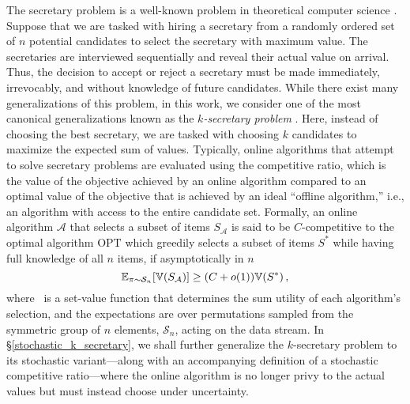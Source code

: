 The secretary problem is a well-known problem in theoretical computer science \cite{dynkin1963optimum,ferguson1989solved}. Suppose that we are tasked with hiring a secretary from a randomly ordered set of $n$ potential candidates to select the secretary with maximum value. The secretaries are interviewed sequentially and reveal their actual value on arrival. Thus, the decision to accept or reject a secretary must be made immediately, irrevocably, and without knowledge of future candidates. While there exist many generalizations of this problem, in this work, we consider one of the most canonical generalizations known as the \textit{$k$-secretary problem} \cite{kleinberg2005multiple}. Here, instead of choosing the best secretary, we are tasked with choosing $k$ candidates to maximize the expected sum of values. Typically, online algorithms that attempt to solve secretary problems are evaluated using the competitive ratio, which is the value of the objective achieved by an online algorithm compared to an optimal value of the objective that is achieved by an ideal ``offline algorithm,” i.e., an algorithm with access to the entire candidate set. Formally, an online algorithm $\mathcal{A}$ that selects a subset of items $S_{\mathcal{A}}$  is said to be $C$-competitive to the optimal algorithm $\textrm{OPT}$ which greedily selects a subset of items $S^*$ while having full knowledge of all $n$ items, if asymptotically in $n$
\begin{equation}
    \mathbb{E}_{\pi\sim \mathcal{S}_n}[\mathbb{V}(S_{\mathcal{A}})] \geq  (C + o(1)) \mathbb{V}(S^*) \,,
    \label{eq:comp_ration}
\end{equation}
where \setvalue\ is a set-value function that determines the sum utility of each algorithm's selection, and the expectations are over permutations sampled from the symmetric group of $n$ elements, $\mathcal{S}_n$, acting on the data stream. In \S\ref{stochastic_k_secretary}, we shall further generalize the $k$-secretary problem to its stochastic variant---along with an accompanying definition of a stochastic competitive ratio---where the online algorithm is no longer privy to the actual values but must instead choose under uncertainty.




